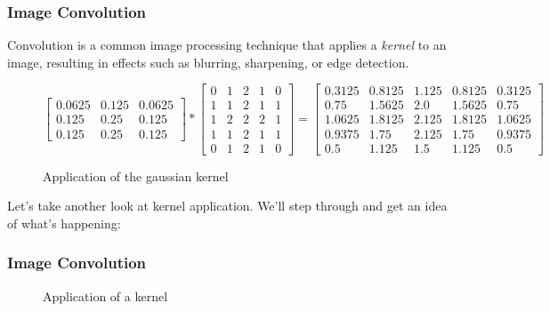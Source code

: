 \documentclass{beamer}
\begin{document}
\begin{frame}
  \frametitle{Image Convolution}

  Convolution is a common image processing technique that applies a
  \emph{kernel} to an image, resulting in effects such as blurring,
  sharpening, or edge detection.

  \begin{tiny}
    \begin{figure}[fragile]
      \[
        \begin{bmatrix}
          0.0625 & 0.125 & 0.0625 \\
          0.125 & 0.25 & 0.125 \\
          0.125 & 0.25 & 0.125
        \end{bmatrix} *
        \begin{bmatrix}
          0 & 1 & 2 & 1 & 0 \\
          1 & 1 & 2 & 1 & 1 \\
          1 & 2 & 2 & 2 & 1 \\
          1 & 1 & 2 & 1 & 1 \\
          0 & 1 & 2 & 1 & 0
        \end{bmatrix} =
        \begin{bmatrix}
          0.3125 & 0.8125  &  1.125   &  0.8125  &  0.3125 \\
          0.75   & 1.5625  &  2.0     &  1.5625  &  0.75   \\
          1.0625 & 1.8125  &  2.125   &  1.8125  &  1.0625 \\
          0.9375 & 1.75    &  2.125   &  1.75    &  0.9375 \\
          0.5    & 1.125   &  1.5     &  1.125   &  0.5
        \end{bmatrix}
      \]
      \caption{Application of the gaussian kernel}
    \end{figure}
  \end{tiny}
\end{frame}

\begin{frame}[fragile]
  Let's take another look at kernel application.  We'll step through
  and get an idea of what's happening:

  \frametitle{Image Convolution}
  \begin{figure}
    \caption{Application of a kernel}
  \end{figure}
\end{frame}
\end{document}
